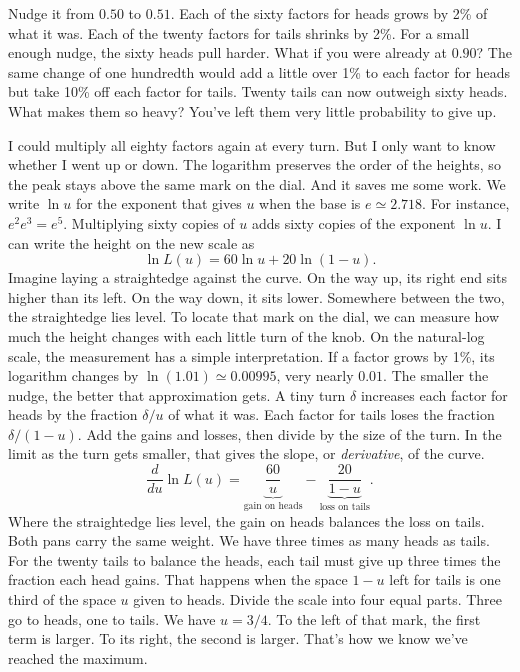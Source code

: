 \documentclass[12pt,oneside]{article}
\begin{document}
Nudge it from $0.50$ to $0.51$. Each of the sixty factors for heads grows by 2\% of what it was. Each of the twenty factors for tails shrinks by 2\%. For a small enough nudge, the sixty heads pull harder. What if you were already at $0.90$? The same change of one hundredth would add a little over 1\% to each factor for heads but take 10\% off each factor for tails. Twenty tails can now outweigh sixty heads. What makes them so heavy? You've left them very little probability to give up.

I could multiply all eighty factors again at every turn. But I only want to know whether I went up or down. The logarithm preserves the order of the heights, so the peak stays above the same mark on the dial. And it saves me some work. We write $\ln u$ for the exponent that gives $u$ when the base is $e\simeq2.718$. For instance, $e^2e^3=e^5$. Multiplying sixty copies of $u$ adds sixty copies of the exponent $\ln u$. I can write the height on the new scale as
\[
              \ln L(u)=60\ln u+20\ln(1-u).
\]
Imagine laying a straightedge against the curve. On the way up, its right end sits higher than its left. On the way down, it sits lower. Somewhere between the two, the straightedge lies level. To locate that mark on the dial, we can measure how much the height changes with each little turn of the knob. On the natural-log scale, the measurement has a simple interpretation. If a factor grows by 1\%, its logarithm changes by $\ln(1.01)\simeq0.00995$, very nearly $0.01$. The smaller the nudge, the better that approximation gets. A tiny turn $\delta$ increases each factor for heads by the fraction $\delta/u$ of what it was. Each factor for tails loses the fraction $\delta/(1-u)$. Add the gains and losses, then divide by the size of the turn. In the limit as the turn gets smaller, that gives the slope, or \emph{derivative}, of the curve.
\[
 \frac{d}{du}\ln L(u)
   =\underbrace{\frac{60}{u}}_{\text{gain on heads}}
    -\underbrace{\frac{20}{1-u}}_{\text{loss on tails}}.
\]
Where the straightedge lies level, the gain on heads balances the loss on tails. Both pans carry the same weight. We have three times as many heads as tails. For the twenty tails to balance the heads, each tail must give up three times the fraction each head gains. That happens when the space $1-u$ left for tails is one third of the space $u$ given to heads. Divide the scale into four equal parts. Three go to heads, one to tails. We have $u=3/4$. To the left of that mark, the first term is larger. To its right, the second is larger. That's how we know we've reached the maximum.
\end{document}
